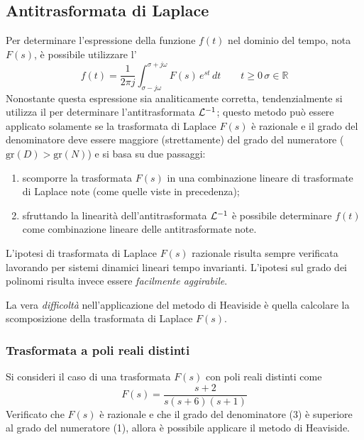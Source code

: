 	\subsection{Antitrasformata di Laplace}
		Per determinare l'espressione  della funzione $f(t)$ nel dominio del tempo, nota $F(s)$, è possibile utilizzare l'
		\begin{equation}
			f(t) = \frac 1 {2\pi j} \int_{\sigma - j\omega} ^{\sigma+j\omega} F(s)\, e^{st}\, dt \qquad t \geq 0 \, \sigma \in \mathds R 
		\end{equation}
		Nonostante questa espressione sia analiticamente corretta, tendenzialmente si utilizza il  per determinare l'antitrasformata $\mathcal L^{-1}$; questo metodo può essere applicato solamente se la trasformata di Laplace $F(s)$ è razionale e il grado del denominatore deve essere maggiore (strettamente) del grado del numeratore ($\textrm{gr}(D) > \textrm{gr}(N)$) e si basa su due passaggi:
		\begin{enumerate}
			\item scomporre la trasformata $F(s)$ in una combinazione lineare di trasformate di Laplace note (come quelle viste in precedenza);
			\item sfruttando la linearità dell'antitrasformata $\mathcal L^{-1}$ è possibile determinare $f(t)$ come combinazione lineare delle antitrasformate note.
		\end{enumerate}
		
		\begin{nota}
			L'ipotesi di trasformata di Laplace $F(s)$ razionale risulta sempre verificata lavorando per sistemi dinamici lineari tempo invarianti. L'ipotesi sul grado dei polinomi risulta invece essere \textit{facilmente aggirabile}.
		\end{nota}
	
		La vera \textit{difficoltà} nell'applicazione del metodo di Heaviside è quella calcolare la scomposizione della trasformata di Laplace $F(s)$.
		
		\subsubsection{Trasformata a poli reali distinti}
			Si consideri il caso di una trasformata $F(s)$ con poli reali distinti come
			\[ F(s) = \frac{s+2}{s(s+6)(s+1)} \]
			Verificato che $F(s)$ è razionale e che il grado del denominatore (3) è superiore al grado del numeratore (1), allora è possibile applicare il metodo di Heaviside.
			
